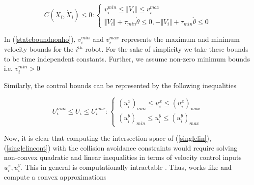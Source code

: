 \documentclass[letterpaper, 10 pt, conference]{IEEEtran}  %
\begin{document}
\begin{equation}
C(X_i,\dot{X}_i)\leq 0 : \left\{
                \begin{array}{ll}
                  v_i^{min}\leq \Vert {V}_i \Vert \leq v_i^{max}\\
                  \Vert V_i\Vert+\tau_{min}\dot{\theta}\leq 0, -\Vert V_i\Vert+\tau_{min}\dot{\theta}\leq 0
                \end{array}
              \right.
\label{stateboundnonho}              
\end{equation}


In (\ref{stateboundnonho}), $v_i^{min}$ and $v_i^{max}$ represents the maximum and minimum velocity bounds for the $i^{th}$ robot. For the sake of simplicity we take these bounds to be time independent constants. Further, we assume  non-zero minimum bounds i.e. $v_i^{min}>0$



Similarly, the control bounds can be represented by the following inequalities



\small
\begin{equation}
U_i^{min}\leq{U}_i\leq U_i^{max} : \left\{
                \begin{array}{ll}
                  (u_i^x)_{min}\leq{u}_i^x\leq(u_i^x)_{max}\\
                  (u_i^y)_{min}\leq{u}_i^y\leq(u_i^y)_{max}
                \end{array}
              \right.
\label{singlelincont}              
\end{equation}
\normalsize

Now, it is clear that computing the intersection space of (\ref{singlelin}), (\ref{singlelincont}) with the collision avoidance constraints would require solving non-convex quadratic and linear inequalities in terms of velocity control inputs $u_i^x, u_i^y$. This in general is computationally intractable \cite{boyd}. Thus, works like \cite{orca} and \cite{joint_util} compute a convex approximations
\end{document}
